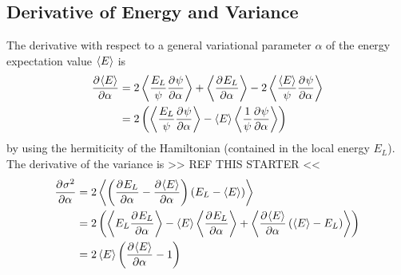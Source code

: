 
\chapter{\label{appendix:B}}


\section{Derivative of Energy and Variance}
    The derivative with respect to a general variational parameter $\alpha$ of
    the energy expectation value $\left< {E} \right>$ is
        \begin{align}
            \prd{\alpha}[\ecp{E}] &= 2\ecp{\frac{E_L}{\psi}\prd{\alpha}[\psi]}
            + \ecp{\prd{\alpha}[E_L]} -
            2\ecp{\frac{\ecp{E}}{\psi}\prd{\alpha}[\psi]} \nonumber \\
            &= 2\left(\ecp{\frac{E_L}{\psi}\prd{\alpha}[\psi]} -
            \ecp{E}\ecp{\frac{1}{\psi}\prd{\alpha}[\psi]}\right)
        \end{align}
    by using the hermiticity of the Hamiltonian (contained in the local energy
    $E_L$). \\
    The derivative of the variance is >> REF THIS STARTER <<
        \begin{align}
            \prd{\alpha}[\sigma^2] &= 2\ecp{\left(\prd{\alpha}[E_L] -
            \prd{\alpha}[\ecp{E}]\right) \left(E_L - \ecp{E}\right)} \nonumber
            \\
            &= 2\left(\ecp{E_L\prd{\alpha}[E_L]} -
            \ecp{E}\ecp{\prd{\alpha}[E_L]} +
            \ecp{\prd{\alpha}[\ecp{E}]\left(\ecp{E} - E_L\right)}\right)
            \nonumber \\
            &= 2\ecp{E}\left(\prd{\alpha}[\ecp{E}] - 1\right)
        \end{align}

